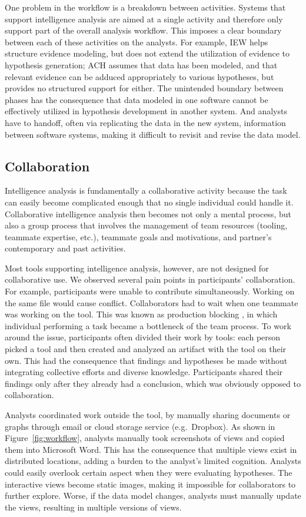One problem in the workflow is a breakdown between activities. Systems that support intelligence analysis are aimed at a single activity and therefore only support part of the overall analysis workflow. This imposes a clear boundary between each of these activities on the analysts. For example, IEW helps structure evidence modeling, but does not extend the utilization of evidence to hypothesis generation; ACH assumes that data has been modeled, and that relevant evidence can be adduced appropriately to various hypotheses, but provides no structured support for either. The unintended boundary between phases has the consequence that data modeled in one software cannot be effectively utilized in hypothesis development in another system. And analysts have to handoff, often via replicating the data in the new system, information between software systems, making it difficult to revisit and revise the data model.


\subsection{Collaboration}

Intelligence analysis is fundamentally a collaborative activity because the task can easily become complicated enough that no single individual could handle it. Collaborative intelligence analysis then becomes not only a mental process, but also a group process that involves the management of team resources (tooling, teammate expertise, etc.), teammate goals and motivations, and partner's contemporary and past activities.

Most tools supporting intelligence analysis, however, are not designed for collaborative use. We observed several pain points in participants’ collaboration. For example, participants were unable to contribute simultaneously. Working on the same file would cause conflict. Collaborators had to wait when one teammate was working on the tool. This was known as production blocking \citep{Diehl1987a}, in which individual performing a task became a bottleneck of the team process. To work around the issue, participants often divided their work by tools: each person picked a tool and then created and analyzed an artifact with the tool on their own. This had the consequence that findings and hypotheses be made without integrating collective efforts and diverse knowledge. Participants shared their findings only after they already had a conclusion, which was obviously opposed to collaboration.

Analysts coordinated work outside the tool, by manually sharing documents or graphs through email or cloud storage service (e.g.~Dropbox). As shown in Figure~\ref{fig:workflow}, analysts manually took screenshots of views and copied them into Microsoft Word. This has the consequence that multiple views exist in distributed locations, adding a burden to the analyst’s limited cognition. Analysts could easily overlook certain aspect when they were evaluating hypotheses. The interactive views become static images, making it impossible for collaborators to further explore. Worse, if the data model changes, analysts must manually update the views, resulting in multiple versions of views.